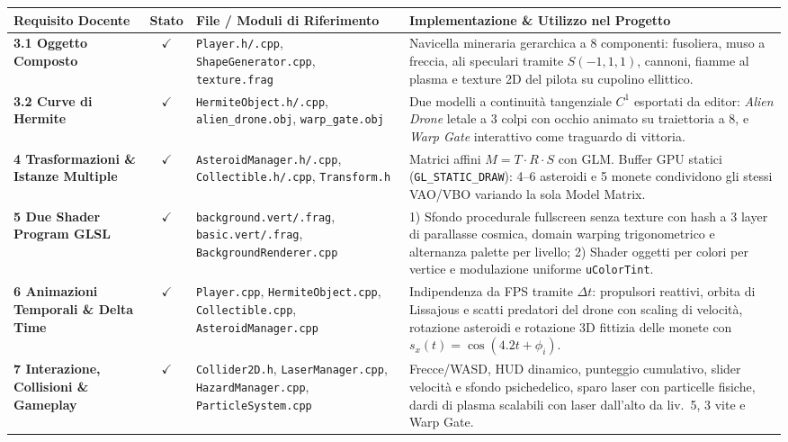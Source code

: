\documentclass[11pt,a4paper]{article}
\begin{document}
\begin{table}[H]
\centering
\small
\begin{tabularx}{\linewidth}{@{}p{3.2cm} c p{4.2cm} X@{}}
\toprule
\textbf{Requisito Docente} & \textbf{Stato} & \textbf{File / Moduli di Riferimento} & \textbf{Implementazione \& Utilizzo nel Progetto} \\
\midrule
\textbf{3.1 Oggetto Composto} & {\color{checkGreen}\textbf{$\checkmark$}} & \texttt{Player.h/.cpp}, \texttt{ShapeGenerator.cpp}, \texttt{texture.frag} & Navicella mineraria gerarchica a 8 componenti: fusoliera, muso a freccia, ali speculari tramite $S(-1,1,1)$, cannoni, fiamme al plasma e texture 2D del pilota su cupolino ellittico. \\
\addlinespace[0.2cm]
\textbf{3.2 Curve di Hermite} & {\color{checkGreen}\textbf{$\checkmark$}} & \texttt{HermiteObject.h/.cpp}, \texttt{alien\_drone.obj}, \texttt{warp\_gate.obj} & Due modelli a continuità tangenziale $C^1$ esportati da editor: \textit{Alien Drone} letale a 3 colpi con occhio animato su traiettoria a 8, e \textit{Warp Gate} interattivo come traguardo di vittoria. \\
\addlinespace[0.2cm]
\textbf{4 Trasformazioni \& Istanze Multiple} & {\color{checkGreen}\textbf{$\checkmark$}} & \texttt{AsteroidManager.h/.cpp}, \texttt{Collectible.h/.cpp}, \texttt{Transform.h} & Matrici affini $M = T \cdot R \cdot S$ con GLM. Buffer GPU statici (\texttt{GL\_STATIC\_DRAW}): 4--6 asteroidi e 5 monete condividono gli stessi VAO/VBO variando la sola Model Matrix. \\
\addlinespace[0.2cm]
\textbf{5 Due Shader Program GLSL} & {\color{checkGreen}\textbf{$\checkmark$}} & \texttt{background.vert/.frag}, \texttt{basic.vert/.frag}, \texttt{BackgroundRenderer.cpp} & 1) Sfondo procedurale fullscreen senza texture con hash a 3 layer di parallasse cosmica, domain warping trigonometrico e alternanza palette per livello; 2) Shader oggetti per colori per vertice e modulazione uniforme \texttt{uColorTint}. \\
\addlinespace[0.2cm]
\textbf{6 Animazioni Temporali \& Delta Time} & {\color{checkGreen}\textbf{$\checkmark$}} & \texttt{Player.cpp}, \texttt{HermiteObject.cpp}, \texttt{Collectible.cpp}, \texttt{AsteroidManager.cpp} & Indipendenza da FPS tramite $\Delta t$: propulsori reattivi, orbita di Lissajous e scatti predatori del drone con scaling di velocità, rotazione asteroidi e rotazione 3D fittizia delle monete con $s_x(t) = \cos(4.2 t + \phi_i)$. \\
\addlinespace[0.2cm]
\textbf{7 Interazione, Collisioni \& Gameplay} & {\color{checkGreen}\textbf{$\checkmark$}} & \texttt{Collider2D.h}, \texttt{LaserManager.cpp}, \texttt{HazardManager.cpp}, \texttt{ParticleSystem.cpp} & Frecce/WASD, HUD dinamico, punteggio cumulativo, slider velocità e sfondo psichedelico, sparo laser con particelle fisiche, dardi di plasma scalabili con laser dall'alto da liv.~5, 3 vite e Warp Gate. \\

\end{tabularx}
\end{table}
\end{document}
